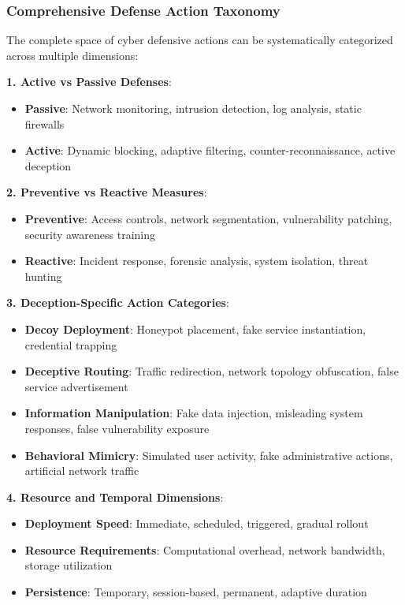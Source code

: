 \documentclass[12pt,oneside]{article}
\begin{document}
\subsubsection{Comprehensive Defense Action Taxonomy}

The complete space of cyber defensive actions can be systematically categorized across multiple dimensions:

\textbf{1. Active vs Passive Defenses}:
\begin{itemize}
\item \textbf{Passive}: Network monitoring, intrusion detection, log analysis, static firewalls
\item \textbf{Active}: Dynamic blocking, adaptive filtering, counter-reconnaissance, active deception
\end{itemize}

\textbf{2. Preventive vs Reactive Measures}:
\begin{itemize}
\item \textbf{Preventive}: Access controls, network segmentation, vulnerability patching, security awareness training
\item \textbf{Reactive}: Incident response, forensic analysis, system isolation, threat hunting
\end{itemize}

\textbf{3. Deception-Specific Action Categories}:
\begin{itemize}
\item \textbf{Decoy Deployment}: Honeypot placement, fake service instantiation, credential trapping
\item \textbf{Deceptive Routing}: Traffic redirection, network topology obfuscation, false service advertisement
\item \textbf{Information Manipulation}: Fake data injection, misleading system responses, false vulnerability exposure
\item \textbf{Behavioral Mimicry}: Simulated user activity, fake administrative actions, artificial network traffic
\end{itemize}

\textbf{4. Resource and Temporal Dimensions}:
\begin{itemize}
\item \textbf{Deployment Speed}: Immediate, scheduled, triggered, gradual rollout
\item \textbf{Resource Requirements}: Computational overhead, network bandwidth, storage utilization
\item \textbf{Persistence}: Temporary, session-based, permanent, adaptive duration
\end{itemize}
\end{document}
